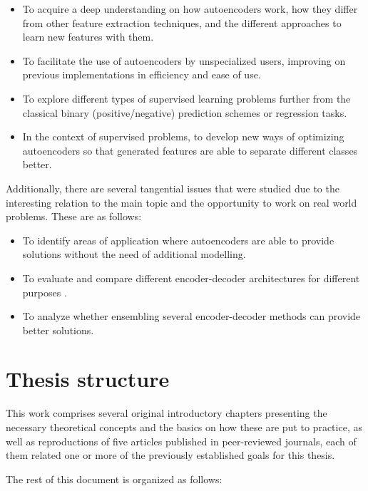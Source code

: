 \begin{itemize}
    \item To acquire a deep understanding on how autoencoders work, how they differ from other feature extraction techniques, and the different approaches to learn new features with them.
    \item To facilitate the use of autoencoders by unspecialized users, improving on previous implementations in efficiency and ease of use.
    \item To explore different types of supervised learning problems further from the classical binary (positive/negative) prediction schemes or regression tasks.
    \item In the context of supervised problems, to develop new ways of optimizing autoencoders so that generated features are able to separate different classes better.
\end{itemize}

Additionally, there are several tangential issues that were studied due to the interesting relation to the main topic and the opportunity to work on real world problems. These are as follows:

\begin{itemize}
    \item To identify areas of application where autoencoders are able to provide solutions without the need of additional modelling.
    \item To evaluate and compare different encoder-decoder architectures for different purposes .
    \item To analyze whether ensembling several encoder-decoder methods can provide better solutions.
\end{itemize}

\section{Thesis structure}

This work comprises several original introductory chapters presenting the necessary theoretical concepts and the basics on how these are put to practice, as well as reproductions of five articles published in peer-reviewed journals, each of them related one or more of the previously established goals for this thesis.

The rest of this document is organized as follows: %

